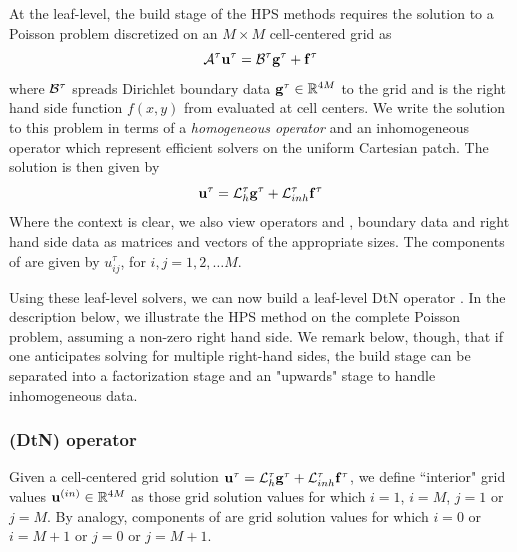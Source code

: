 At the leaf-level, the build stage of the HPS methods requires the solution to a Poisson problem  discretized on an $M \times M$ cell-centered grid as
\begin{equation}
\mathcal A^{\tau} \mathbf u^{\tau} = \mathcal B^\tau \mathbf g^{\tau} + \mathbf f^{\tau}
\label{eq:patch_poisson_problem}
\end{equation}
where $\mathcal B^\tau$ spreads Dirichlet boundary data $\mathbf g^{\tau} \in \mathbb R^{4M}$ to the grid and \ftau is the right hand side function $f(x,y)$ from  evaluated at cell centers.  We write the solution to this problem in terms of a {\em homogeneous operator} \Lhtau and an inhomogeneous operator \Linhtau which represent efficient solvers on the uniform Cartesian patch. The solution is then given by 
\begin{equation}
\mathbf u^{\tau} = \mathcal L_h^{\tau} \mathbf g^{\tau} + \mathcal L_{inh}^{\tau} \mathbf f^{\tau}
\label{eq:patch_leaf_solve}
\end{equation}
Where the context is clear, we also view operators \Lhtau and \Linhtau, boundary data \gtau and right hand side data \ftau as matrices and vectors of the appropriate sizes. The components of \utau are given by $u^\tau_{ij}$, for $i,j = 1,2,\hdots M$.  

Using these leaf-level solvers, we can now build a leaf-level DtN operator \Ttau.  In the description below, we illustrate the HPS method on the complete Poisson problem, assuming a non-zero right hand side.  We remark below, though, that if one anticipates solving for multiple right-hand sides, the build stage can be separated into a factorization stage and an "upwards" stage to handle inhomogeneous data.  


\subsubsection{\DtN (DtN) operator}
Given a cell-centered grid solution $\mathbf u^{\tau} = \mathcal L_h^{\tau} \mathbf g^{\tau} + \mathcal L_{inh}^{\tau} \mathbf f^{\tau}$, we define ``interior" grid values $\mathbf u^{(in)} \in \mathbb R^{4M}$ as those grid solution values \utau for which $i = 1$, $i = M$, $j = 1$ or $j = M$.  By analogy, components of \uout are grid solution values for which $i=0$ or $i = M+1$ or $j = 0$ or $j = M+1$.     

